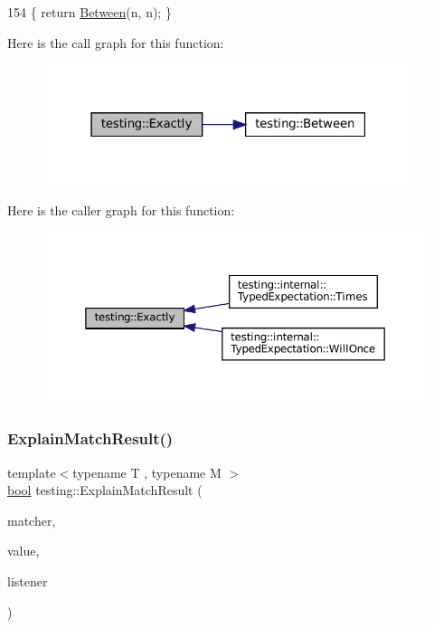\begin{DoxyCode}
154 \{ \textcolor{keywordflow}{return} \hyperlink{namespacetesting_a3bb2d3cdd3fdf5b4be1480fce549918e}{Between}(n, n); \}
\end{DoxyCode}
Here is the call graph for this function\+:
\nopagebreak
\begin{figure}[H]
\begin{center}
\leavevmode
\includegraphics[width=307pt]{namespacetesting_aa9b1b32ba9e8d3db8ac0af0fc8785c8d_cgraph}
\end{center}
\end{figure}
Here is the caller graph for this function\+:
\nopagebreak
\begin{figure}[H]
\begin{center}
\leavevmode
\includegraphics[width=350pt]{namespacetesting_aa9b1b32ba9e8d3db8ac0af0fc8785c8d_icgraph}
\end{center}
\end{figure}
\mbox{\label{namespacetesting_a6d5fbd5104dafc63bf705dafbcb5ce18}} 
\subsubsection{\texorpdfstring{Explain\+Match\+Result()}{ExplainMatchResult()}}
{\footnotesize\ttfamily template$<$typename T , typename M $>$ \\
\hyperlink{classbool}{bool} testing\+::\+Explain\+Match\+Result (\begin{DoxyParamCaption}\item[{M}]{matcher,  }\item[{const T \&}]{value,  }\item[{\hyperlink{classtesting_1_1MatchResultListener}{Match\+Result\+Listener} $\ast$}]{listener }\end{DoxyParamCaption})\hspace{0.3cm}{\ttfamily [inline]}}



